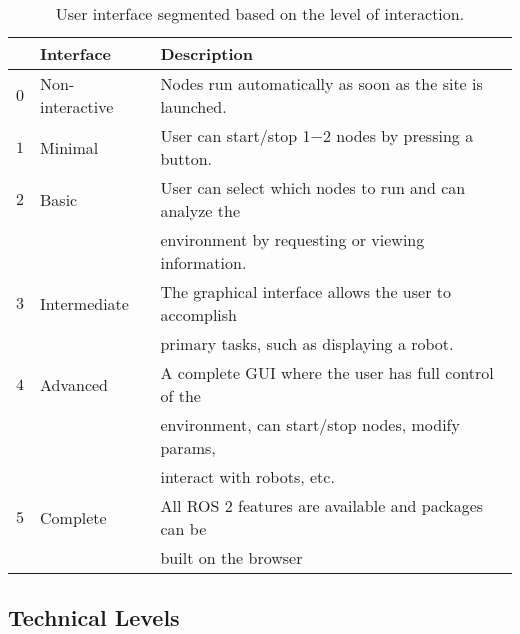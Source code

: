         \begin{table}[htbp]
            \color{textColor}
            \centering	
            \caption{User interface segmented based on the level of interaction.}
                \begin{tabular}{rll}
                    \toprule
                    & \textbf{Interface} & \textbf{Description} \\
                    \midrule
                    $0$ & Non-interactive & Nodes run automatically as soon as the site is launched. \\ [0.5em]

                    $1$ & Minimal         & User can start/stop 1$-$2 nodes by pressing a button. \\[0.5em]

                    $2$ & Basic           & User can select which nodes to run and can analyze the \\
                    & & environment by requesting or viewing information. \\[0.5em]

                    $3$ & Intermediate    & The graphical interface allows the user to accomplish \\
                    & & primary tasks, such as displaying a robot. \\[0.5em]

                    $4$ & Advanced        & A complete \ac{GUI} where the user has full control of the \\
                    & & environment, can start/stop nodes, modify params, \\
                    & & interact with robots, etc. \\[0.5em]

                    $5$ & Complete        & All ROS 2 features are available and packages can be \\
                    & & built on the browser \\

                \bottomrule
            \end{tabular}\label{tab:uilevels}
        \end{table}

    \subsection{Technical Levels}

